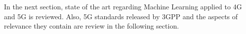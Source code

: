 In the next section, state of the art regarding Machine Learning applied to \ac{4G} and \ac{5G} is reviewed. Also, 5G standards released by \ac{3GPP} and the aspects of relevance they contain are review in the following section.








\begin{comment}
 \ac{acro} 
 
 \acf{acro}
 
 \acs{acro}
 
 \acl{acro}
 
 \acp{acro}
\end{comment}
 